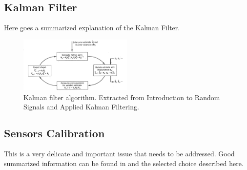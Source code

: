 \documentclass[a4paper,10pt]{article}
\begin{document}
\subsection{Kalman Filter}
\label{sec:KalmanFilter}
Here goes a summarized explanation of the Kalman Filter.
\begin{figure}[!ht]
 \centering
 \includegraphics[width=0.5\textwidth]{./fig/kalman_loop.png}
 \caption{Kalman filter algorithm. Extracted from Introduction to Random Signals and Applied Kalman Filtering.}
 \label{fig:kalmanLoop}
\end{figure}

\subsection{Sensors Calibration}
This is a very delicate and important issue that needs to be addressed. Good summarized information can be found in \cite{Cucu2012} and the selected choice described here.
\end{document}
